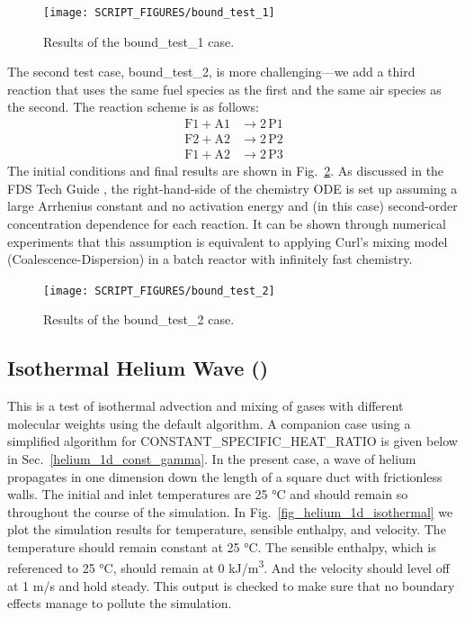 \documentclass[11pt]{book}
\begin{document}
\begin{figure}[!ht]
   \centering
   \texttt{[image: SCRIPT\_FIGURES/bound\_test\_1]}
   \caption[Results of the {\ct bound\_test\_1} case]{Results of the {\ct bound\_test\_1} case.}
   \label{fig:bound_test_1}
\end{figure}

The second test case, {\ct bound\_test\_2}, is more challenging---we add a third reaction that uses the same fuel species as the first and the same air species as the second.  The reaction scheme is as follows:
\begin{align}
\mathrm{F1} + \mathrm{A1} &\rightarrow 2\,\mathrm{P1} \\
\mathrm{F2} + \mathrm{A2} &\rightarrow 2\,\mathrm{P2} \\
\mathrm{F1} + \mathrm{A2} &\rightarrow 2\,\mathrm{P3}
\end{align}
The initial conditions and final results are shown in Fig.~\ref{fig:bound_test_2}.  As discussed in the FDS Tech Guide \cite{FDS_Math_Guide}, the right-hand-side of the chemistry ODE is set up assuming a large Arrhenius constant and no activation energy and (in this case) second-order concentration dependence for each reaction.  It can be shown through numerical experiments that this assumption is equivalent to applying Curl's mixing model (Coalescence-Dispersion) \cite{Curl:1} in a batch reactor with infinitely fast chemistry.
\begin{figure}[!ht]
   \centering
   \texttt{[image: SCRIPT\_FIGURES/bound\_test\_2]}
   \caption[Results of the {\ct bound\_test\_2} case]{Results of the {\ct bound\_test\_2} case.}
   \label{fig:bound_test_2}
\end{figure}

\subsection{Isothermal Helium Wave (\texorpdfstring{}{helium\_1d\_isothermal})}
\label{helium_1d_isothermal}

This is a test of isothermal advection and mixing of gases with different molecular weights using the default algorithm.  A companion case using a simplified algorithm for {\ct CONSTANT\_SPECIFIC\_HEAT\_RATIO} is given below in Sec.~\ref{helium_1d_const_gamma}.  In the present case, a wave of helium propagates in one dimension down the length of a square duct with frictionless walls.  The initial and inlet temperatures are 25 \si{\degreeCelsius} and should remain so throughout the course of the simulation. In Fig.~\ref{fig_helium_1d_isothermal} we plot the simulation results for temperature, sensible enthalpy, and velocity.  The temperature should remain constant at 25 \si{\degreeCelsius}.  The sensible enthalpy, which is referenced to 25 \si{\degreeCelsius}, should remain at 0 \si{kJ/m^3}.  And the velocity should level off at 1 m/s and hold steady.  This output is checked to make sure that no boundary effects manage to pollute the simulation.
\end{document}
